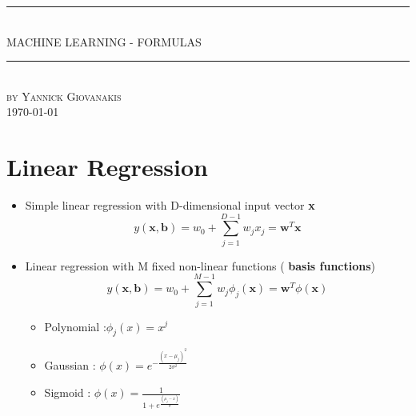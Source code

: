 \documentclass[12pt]{article} %
\begin{document}

\begin{titlepage}

\newcommand{\HRule}{\rule{\linewidth}{0.5mm}} %

\center %
\HRule \\[0.5cm]
{ \LARGE  MACHINE LEARNING - FORMULAS}\\[0.8cm] %
\HRule \\[1.5cm]
\textsc{\large by Yannick Giovanakis}\\[5.5cm] %

\vfill
{\large \today}\\[3cm] %
\end{titlepage}


\tableofcontents %

\newpage %

\section{Linear Regression}
\begin{itemize}
\item Simple linear regression with D-dimensional input vector \textbf{x}
$$ y(\bm{x,b}) = w_0 + \sum \limits_{j=1}^{D-1}w_jx_j = \bm{w}^T \bm{x}$$

\item Linear regression with M fixed non-linear functions ( \textbf{basis functions})
$$ y(\bm{x,b}) = w_0 + \sum \limits_{j=1}^{M-1}w_j \phi_j(\bm{x}) = \bm{w}^T \phi (\bm{x})$$
\begin{itemize}
\item Polynomial :$\phi_j(x) = x^j$
\item Gaussian : $\phi(x) = e^{-\frac{(x-\mu_j)^2}{2 \sigma ^2}}$
\item Sigmoid : $\phi(x) = \frac{1}{1+e^{\frac{(\mu_j - x)}{\sigma}}}$
\end{itemize}
\end{itemize}
\end{document}
